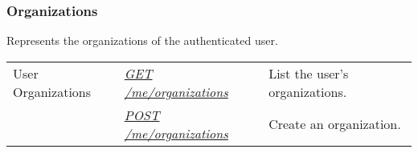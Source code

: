 \documentclass[letterpaper,10pt,english]{sphinxmanual}
\begin{document}
\subsubsection{Organizations}
\label{\detokenize{resources/user:organizations}}
Represents the organizations of the authenticated user.

\noindent\begin{tabulary}{\linewidth}{|L|L|L|}
\hline
{}\relax &\relax &\relax \\
\hline
User Organizations
&
{\hyperref[\detokenize{resources/user:get--me-organizations}]{\emph{GET /me/organizations}}}
&
List the user's organizations.
\\
\hline&
{\hyperref[\detokenize{resources/user:post--me-organizations}]{\emph{POST /me/organizations}}}
&
Create an organization.
\\
\hline\end{tabulary}


\begin{DUlineblock}{0em}
\item[] 
\end{DUlineblock}
\end{document}
